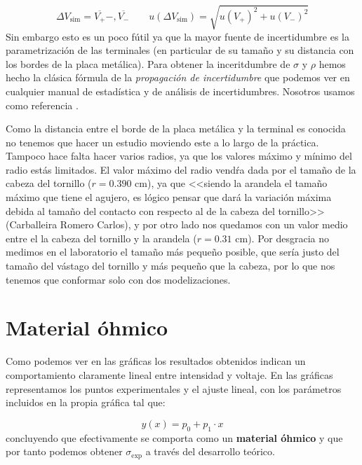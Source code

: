 \documentclass[11pt]{article}
\newcommand{\simu}{\text{sim}}
\begin{document}
\begin{equation}
	\Delta V_{\simu} = {\overline{V_+} - ,\overline{V_-}}  \qquad u(\Delta V_{\simu})  = \sqrt{u(V_+)^2 + u(V_-)^2}
\end{equation}
Sin embargo esto es un poco fútil ya que la mayor fuente de incertidumbre es la parametrización de las terminales (en particular de su tamaño y su distancia con los bordes de la placa metálica). Para obtener la inceritdumbre de $\sigma$ y $\rho$ hemos hecho la clásica fórmula de la \textit{propagación de incertidumbre} que podemos ver en cualquier manual de estadística y de análisis de incertidumbres. Nosotros usamos como referencia \cite{Estadistica}.


Como la distancia entre el borde de la placa metálica y la terminal es conocida no tenemos que hacer un estudio moviendo este a lo largo de la práctica. Tampoco hace falta hacer varios radios, ya que los valores máximo y mínimo del radio estás limitados. El valor máximo del radio vendŕa dada por  el tamaño de la cabeza del tornillo ($r=0.390$ cm), ya que <<siendo la arandela el tamaño máximo que tiene el agujero, es lógico pensar que dará la variación máxima debida al tamaño del contacto con respecto al de la cabeza del tornillo>> (Carballeira Romero Carlos), y por otro lado nos quedamos con un valor medio entre el la cabeza del tornillo y la arandela ($r=0.31$ cm). Por desgracia no medimos en el laboratorio el tamaño más pequeño posible, que sería justo del tamaño del vástago del tornillo y más pequeño que la cabeza, por lo que nos tenemos que conformar solo con dos modelizaciones. 

\section{Material óhmico} \label{Sec:04}

Como podemos ver en las gráficas los resultados obtenidos indican un comportamiento claramente lineal entre intensidad y voltaje. En las gráficas representamos los puntos experimentales y el ajuste lineal, con los parámetros incluidos en la propia gráfica tal que: 

\begin{equation}
	y(x) = p_0 + p_1 \cdot x
\end{equation}
concluyendo que efectivamente se comporta como un \textbf{material óhmico} y que por tanto podemos obtener $\sigma_{\exp}$ a través del desarrollo teórico. 
\end{document}
